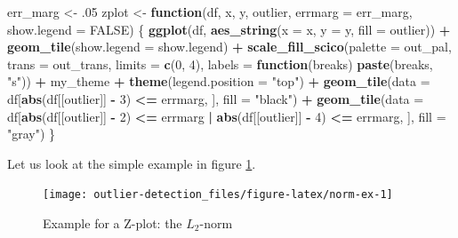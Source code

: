 \documentclass[]{report}
\newenvironment{Shaded}{\begin{snugshade}}{\end{snugshade}}
\newcommand{\ControlFlowTok}[1]{\textcolor[rgb]{0.13,0.29,0.53}{\textbf{#1}}}
\newcommand{\DataTypeTok}[1]{\textcolor[rgb]{0.13,0.29,0.53}{#1}}
\newcommand{\DecValTok}[1]{\textcolor[rgb]{0.00,0.00,0.81}{#1}}
\newcommand{\FloatTok}[1]{\textcolor[rgb]{0.00,0.00,0.81}{#1}}
\newcommand{\KeywordTok}[1]{\textcolor[rgb]{0.13,0.29,0.53}{\textbf{#1}}}
\newcommand{\NormalTok}[1]{#1}
\newcommand{\OperatorTok}[1]{\textcolor[rgb]{0.81,0.36,0.00}{\textbf{#1}}}
\newcommand{\OtherTok}[1]{\textcolor[rgb]{0.56,0.35,0.01}{#1}}
\newcommand{\StringTok}[1]{\textcolor[rgb]{0.31,0.60,0.02}{#1}}
\theoremstyle{definition}
\theoremstyle{definition}
\theoremstyle{definition}
\theoremstyle{remark}
\begin{document}
\begin{Shaded}
\begin{Highlighting}[]
\NormalTok{err_marg <-}\StringTok{ }\FloatTok{.05}
\NormalTok{zplot <-}\StringTok{ }\ControlFlowTok{function}\NormalTok{(df, x, y, outlier, }\DataTypeTok{errmarg =}\NormalTok{ err_marg, }\DataTypeTok{show.legend =} \OtherTok{FALSE}\NormalTok{) \{}
  \KeywordTok{ggplot}\NormalTok{(df, }\KeywordTok{aes_string}\NormalTok{(}\DataTypeTok{x =}\NormalTok{ x, }\DataTypeTok{y =}\NormalTok{ y, }\DataTypeTok{fill =}\NormalTok{ outlier)) }\OperatorTok{+}
\StringTok{    }\KeywordTok{geom_tile}\NormalTok{(}\DataTypeTok{show.legend =}\NormalTok{ show.legend) }\OperatorTok{+}
\StringTok{    }\KeywordTok{scale_fill_scico}\NormalTok{(}\DataTypeTok{palette =}\NormalTok{ out_pal, }\DataTypeTok{trans =}\NormalTok{ out_trans, }\DataTypeTok{limits =} \KeywordTok{c}\NormalTok{(}\DecValTok{0}\NormalTok{, }\DecValTok{4}\NormalTok{),}
                     \DataTypeTok{labels =}
                       \ControlFlowTok{function}\NormalTok{(breaks) }\KeywordTok{paste}\NormalTok{(breaks, }\StringTok{"s"}\NormalTok{)) }\OperatorTok{+}
\StringTok{    }\NormalTok{my_theme }\OperatorTok{+}
\StringTok{    }\KeywordTok{theme}\NormalTok{(}\DataTypeTok{legend.position =} \StringTok{"top"}\NormalTok{) }\OperatorTok{+}
\StringTok{    }\KeywordTok{geom_tile}\NormalTok{(}\DataTypeTok{data =}\NormalTok{ df[}\KeywordTok{abs}\NormalTok{(df[[outlier]] }\OperatorTok{-}\StringTok{ }\DecValTok{3}\NormalTok{) }\OperatorTok{<=}\StringTok{ }\NormalTok{errmarg, ],}
              \DataTypeTok{fill =} \StringTok{"black"}\NormalTok{) }\OperatorTok{+}
\StringTok{    }\KeywordTok{geom_tile}\NormalTok{(}\DataTypeTok{data =}\NormalTok{ df[}\KeywordTok{abs}\NormalTok{(df[[outlier]] }\OperatorTok{-}\StringTok{ }\DecValTok{2}\NormalTok{) }\OperatorTok{<=}\StringTok{ }\NormalTok{errmarg }\OperatorTok{|}
\StringTok{                                     }\KeywordTok{abs}\NormalTok{(df[[outlier]] }\OperatorTok{-}\StringTok{ }\DecValTok{4}\NormalTok{) }\OperatorTok{<=}\StringTok{ }\NormalTok{errmarg, ],}
              \DataTypeTok{fill =} \StringTok{"gray"}\NormalTok{)}
\NormalTok{\}}
\end{Highlighting}
\end{Shaded}

Let us look at the simple example in figure \ref{fig:norm-ex}.

\begin{figure}

{\centering \texttt{[image: outlier-detection\_files/figure-latex/norm-ex-1]} 

}

\caption{Example for a Z-plot: the \(L_2\)-norm}\label{fig:norm-ex}
\end{figure}
\end{document}
